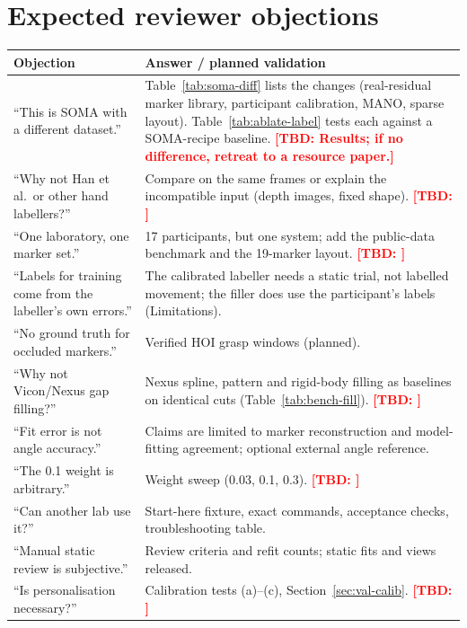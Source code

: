 \documentclass[11pt,a4paper]{article}
\newcommand{\tbd}[1]{\textcolor{red}{\textbf{[TBD: #1]}}}
\begin{document}
\section*{Expected reviewer objections}
\begin{tabularx}{\linewidth}{@{}XX@{}}\toprule
Objection & Answer / planned validation \\\midrule
``This is SOMA with a different dataset.'' & Table~\ref{tab:soma-diff} lists the changes (real-residual marker library, participant calibration, MANO, sparse layout). Table~\ref{tab:ablate-label} tests each against a SOMA-recipe baseline. \tbd{Results; if no difference, retreat to a resource paper.} \\
``Why not Han et al.\ or other hand labellers?'' & Compare on the same frames or explain the incompatible input (depth images, fixed shape). \tbd{} \\
``One laboratory, one marker set.'' & 17 participants, but one system; add the public-data benchmark and the 19-marker layout. \tbd{} \\
``Labels for training come from the labeller's own errors.'' & The calibrated labeller needs a static trial, not labelled movement; the filler does use the participant's labels (Limitations). \\
``No ground truth for occluded markers.'' & Verified HOI grasp windows (planned). \\
``Why not Vicon/Nexus gap filling?'' & Nexus spline, pattern and rigid-body filling as baselines on identical cuts (Table~\ref{tab:bench-fill}). \tbd{} \\
``Fit error is not angle accuracy.'' & Claims are limited to marker reconstruction and model-fitting agreement; optional external angle reference. \\
``The 0.1 weight is arbitrary.'' & Weight sweep (0.03, 0.1, 0.3). \tbd{} \\
``Can another lab use it?'' & Start-here fixture, exact commands, acceptance checks, troubleshooting table. \\
``Manual static review is subjective.'' & Review criteria and refit counts; static fits and views released. \\
``Is personalisation necessary?'' & Calibration tests (a)--(c), Section~\ref{sec:val-calib}. \tbd{} \\\bottomrule
\end{tabularx}



\end{document}

